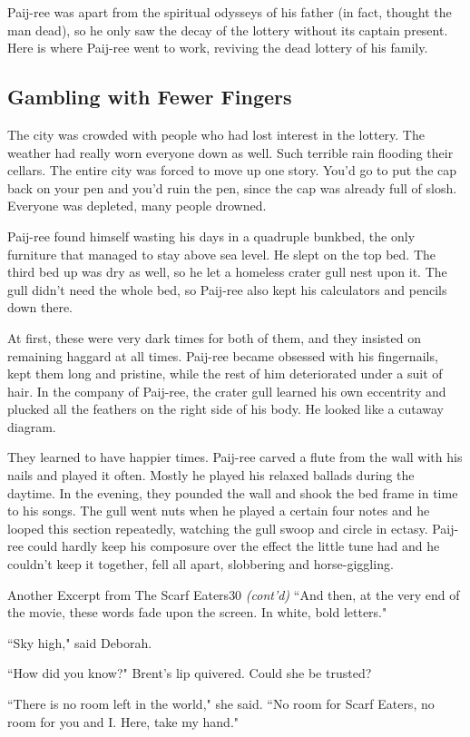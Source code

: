 \documentclass[10pt,twoside]{report}
\begin{document}
Paij-ree was apart from the spiritual odysseys of his father (in fact,
thought the man dead), so he only saw the decay of the lottery without
its captain present.  Here is where Paij-ree went to work, reviving
the dead lottery of his family.



\subsection{Gambling with Fewer Fingers}



The city was crowded with people who had lost interest in the lottery.
The weather had really worn everyone down as well.  Such terrible rain
flooding their cellars. The entire city was forced to move up one
story.  You'd go to put the cap back on your pen and you'd ruin the
pen, since the cap was already full of slosh.  Everyone was depleted,
many people drowned.

Paij-ree found himself wasting his days in a quadruple bunkbed, the
only furniture that managed to stay above sea level.  He slept on the
top bed.  The third bed up was dry as well, so he let a homeless
crater gull nest upon it.  The gull didn't need the whole bed, so
Paij-ree also kept his calculators and pencils down there.

At first, these were very dark times for both of them, and they
insisted on remaining haggard at all times.  Paij-ree became obsessed
with his fingernails, kept them long and pristine, while the rest of
him deteriorated under a suit of hair.  In the company of Paij-ree,
the crater gull learned his own eccentrity and plucked all the
feathers on the right side of his body.  He looked like a cutaway
diagram.

They learned to have happier times.  Paij-ree carved a flute from the
wall with his nails and played it often.  Mostly he played his relaxed
ballads during the daytime.  In the evening, they pounded the wall and
shook the bed frame in time to his songs.  The gull went nuts when he
played a certain four notes and he looped this section repeatedly,
watching the gull swoop and circle in ectasy.  Paij-ree could hardly
keep his composure over the effect the little tune had and he couldn't
keep it together, fell all apart, slobbering and horse-giggling.

	\begin{sidebar}{Another Excerpt from The Scarf Eaters}{30}
		\textit{(cont'd)} ``And then, at the very end of the movie, these words fade upon the screen. In white, bold letters."\vspace{6pt}
		
		``Sky high," said Deborah.\vspace{6pt}
	
		``How did you know?" Brent's lip quivered. Could she be trusted?\vspace{6pt}
	
		``There is no room left in the world," she said. ``No room for Scarf Eaters, no room for you and I. Here, take my hand."
	\end{sidebar}
\end{document}

